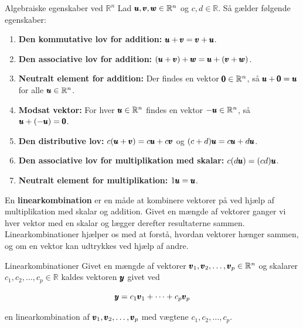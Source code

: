 \begin{custombox}{Algebraiske egenskaber ved $\mathbb{R}^n$}
    Lad $\pmb{u}, \pmb{v}, \pmb{w} \in \mathbb{R}^n$ og $c, d \in \mathbb{R}$. Så gælder følgende egenskaber:
    \begin{enumerate}
        \item \textbf{Den kommutative lov for addition:} $\pmb{u} + \pmb{v} = \pmb{v} + \pmb{u}$.
        \item \textbf{Den associative lov for addition:} $(\pmb{u} + \pmb{v}) + \pmb{w} = \pmb{u} + (\pmb{v} + \pmb{w})$.
        \item \textbf{Neutralt element for addition:} Der findes en vektor $\pmb{0} \in \mathbb{R}^n$, så $\pmb{u} + \pmb{0} = \pmb{u}$ for alle $\pmb{u} \in \mathbb{R}^n$.
        \item \textbf{Modsat vektor:} For hver $\pmb{u} \in \mathbb{R}^n$ findes en vektor $-\pmb{u} \in \mathbb{R}^n$, så $\pmb{u} + (-\pmb{u}) = \pmb{0}$.
        \item \textbf{Den distributive lov:} $c(\pmb{u} + \pmb{v}) = c\pmb{u} + c\pmb{v}$ og $(c + d)\pmb{u} = c\pmb{u} + d\pmb{u}$.
        \item \textbf{Den associative lov for multiplikation med skalar:} $c(d\pmb{u}) = (cd)\pmb{u}$.
        \item \textbf{Neutralt element for multiplikation:} $1\pmb{u} = \pmb{u}$.
    \end{enumerate}  
\end{custombox}

En \textbf{linearkombination} er en måde at kombinere vektorer på ved hjælp af multiplikation med skalar og addition. Givet en mængde af vektorer ganger vi hver vektor med en skalar og lægger derefter resultaterne sammen. Linearkombinationer hjælper os med at forstå, hvordan vektorer hænger sammen, og om en vektor kan udtrykkes ved hjælp af andre.

\begin{definition}{Linearkombinationer}
    Givet en mængde af vektorer $\pmb{v}_1, \pmb{v}_2, \ldots, \pmb{v}_p \in \mathbb{R}^n$ og skalarer $c_1, c_2, \ldots, c_p \in \mathbb{R}$ kaldes vektoren $\pmb{y}$ givet ved

\[
\pmb{y} = c_1 \pmb{v}_1 + \cdots + c_p \pmb{v}_p
\]

en linearkombination af $\pmb{v}_1, \pmb{v}_2, \ldots, \pmb{v}_p$ med vægtene $c_1, c_2, \ldots, c_p$.

\end{definition}

